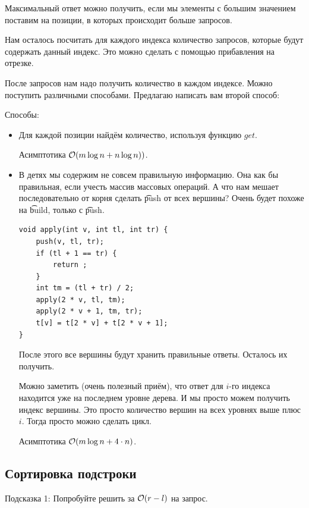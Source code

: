 Максимальный ответ можно получить, если мы элементы с большим значением поставим на позиции, в которых происходит больше запросов.

Нам осталось посчитать для каждого индекса количество запросов, которые будут содержать данный индекс. Это можно сделать с помощью прибавления на отрезке.

После запросов нам надо получить количество в каждом индексе. Можно поступить различными способами. Предлагаю написать вам второй способ:

\down

Способы:

\up \up
\begin{itemize}
	\item Для каждой позиции найдём количество, используя функцию $get$.
	
	Асимптотика $\mathcal{O}(m \log n + n \log n))$.
	
	\item  В детях мы содержим не совсем правильную информацию. Она как бы правильная, если учесть массив массовых операций. А что нам мешает последовательно от корня сделать \t{push} от всех вершины? Очень будет похоже на \t{build}, только с \t{push}.
	
\begin{verbatim}
void apply(int v, int tl, int tr) {
	push(v, tl, tr);
	if (tl + 1 == tr) {
		return ;
	}
	int tm = (tl + tr) / 2;
	apply(2 * v, tl, tm);
	apply(2 * v + 1, tm, tr);
	t[v] = t[2 * v] + t[2 * v + 1];
}
\end{verbatim}

	После этого все вершины будут хранить правильные ответы. Осталось их получить.
	
	Можно заметить (очень полезный приём), что ответ для $i$-го индекса находится уже на последнем уровне дерева. И мы просто можем получить индекс вершины. Это просто количество вершин на всех уровнях выше плюс $i$. Тогда просто можно сделать цикл.
	
	Асимптотика $\mathcal{O}(m \log n + 4 \cdot n)$.
\end{itemize}

\subsection{Сортировка подстроки}

\href{https://codeforces.com/problemset/problem/558/E}{}

Подсказка 1: Попробуйте решить за $\mathcal{O}(r - l)$ на запрос.

